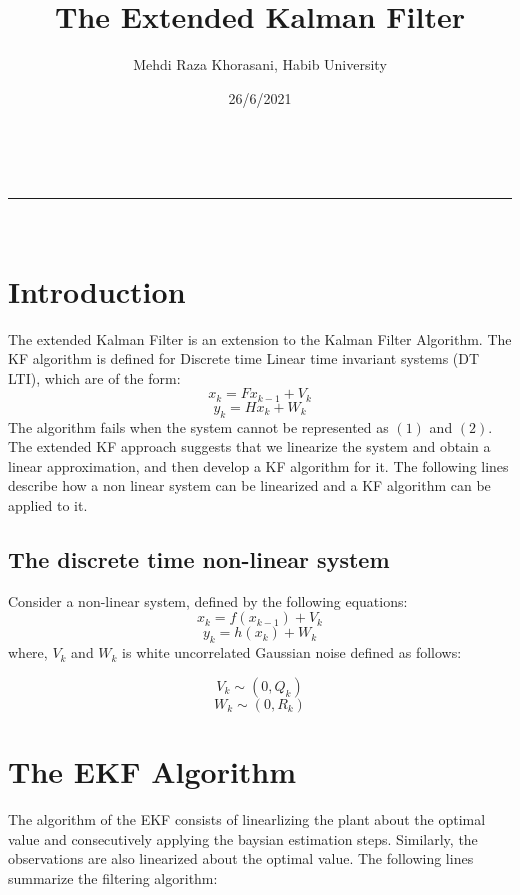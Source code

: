 \documentclass[a4paper,11pt]{article}
\makeatletter
\newcommand{\linia}{\rule{\linewidth}{0.5pt}}
\theoremstyle{mytheor}
\renewcommand{\maketitle}{
\begin{center}
\vspace{2ex}
{\huge \textsc{\@title}}
\vspace{1ex}
\\
\linia\\
\@author \hfill \@date
\vspace{4ex}
\end{center}
}
\makeatother
\begin{document}
\title{The Extended Kalman Filter}

\author{Mehdi Raza Khorasani, Habib University}

\date{26/6/2021}

\maketitle

\section*{Introduction}
The extended Kalman Filter is an extension to the Kalman Filter Algorithm. The KF algorithm is defined for Discrete time Linear time invariant systems (DT LTI), which are of the form: 
\begin{equation}
    x_k = Fx_{k-1} + V_k 
\end{equation}
\begin{equation}
    y_k = Hx_{k} + W_k 
\end{equation}
The algorithm fails when the system cannot be represented as $(1)$ and $(2)$. The extended KF approach suggests that we linearize the system and obtain a linear approximation, and then develop a KF algorithm for it. The following lines describe how a non linear system can be linearized and a KF algorithm can be applied to it.
\subsection*{The discrete time non-linear system}
Consider a non-linear system, defined by the following equations: 
\begin{equation}
    x_k = f(x_{k-1}) + V_k 
\end{equation}
\begin{equation}
    y_k = h(x_{k}) + W_k
\end{equation}
where, $V_k$ and $W_k$ is white uncorrelated Gaussian noise defined as follows: 

\begin{equation*}
    V_k \sim (0, Q_k)
\end{equation*}
\begin{equation*}
    W_k \sim (0, R_k)
\end{equation*}

\section*{The EKF Algorithm}
The algorithm of the EKF consists of linearlizing the plant about the optimal value and consecutively applying the baysian estimation steps. Similarly, the observations are also linearized about the optimal value. The following lines summarize the filtering algorithm: 
\end{document}
